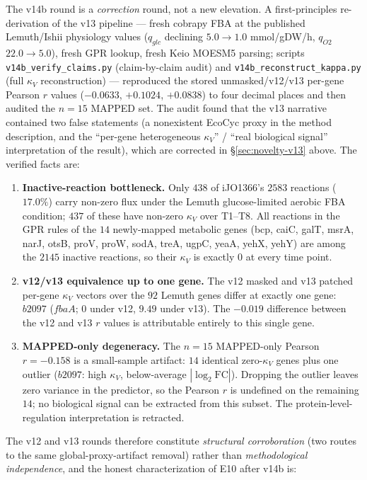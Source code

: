 \documentclass[11pt,a4paper]{article}
\theoremstyle{plain}
\theoremstyle{definition}
\theoremstyle{remark}
\begin{document}
The v14b round is a \emph{correction} round, not a new elevation. A
first-principles re-derivation of the v13 pipeline --- fresh cobrapy
FBA at the published Lemuth/Ishii physiology values ($q_{glc}$
declining $5.0 \to 1.0$ mmol/gDW/h, $q_{O2}$ $22.0 \to 5.0$), fresh
GPR lookup, fresh Keio MOESM5 parsing; scripts
\texttt{v14b\_verify\_claims.py} (claim-by-claim audit) and
\texttt{v14b\_reconstruct\_kappa.py} (full $\kappa_V$ reconstruction)
--- reproduced the stored unmasked/v12/v13 per-gene Pearson $r$ values
($-0.0633$, $+0.1024$, $+0.0838$) to four decimal places and then
audited the $n=15$ MAPPED set. The audit found that the v13 narrative
contained two false statements (a nonexistent EcoCyc proxy in the
method description, and the ``per-gene heterogeneous $\kappa_V$'' /
``real biological signal'' interpretation of the result), which are
corrected in \S\ref{sec:novelty-v13} above. The verified facts are:
\begin{enumerate}\itemsep0pt
\item \textbf{Inactive-reaction bottleneck.} Only $438$ of iJO1366's
  $2583$ reactions ($17.0\%$) carry non-zero flux under the Lemuth
  glucose-limited aerobic FBA condition; $437$ of these have non-zero
  $\kappa_V$ over T1--T8. All reactions in the GPR rules of the $14$
  newly-mapped metabolic genes (bcp, caiC, galT, msrA, narJ, otsB,
  proV, proW, sodA, treA, ugpC, yeaA, yehX, yehY) are among the
  $2145$ inactive reactions, so their $\kappa_V$ is exactly $0$ at
  every time point.
\item \textbf{v12/v13 equivalence up to one gene.} The v12 masked and
  v13 patched per-gene $\kappa_V$ vectors over the $92$ Lemuth genes
  differ at exactly one gene: $b2097$ ($\mathit{fbaA}$; $0$ under v12,
  $9.49$ under v13). The $-0.019$ difference between the v12 and v13
  $r$ values is attributable entirely to this single gene.
\item \textbf{MAPPED-only degeneracy.} The $n=15$ MAPPED-only Pearson
  $r = -0.158$ is a small-sample artifact: $14$ identical
  zero-$\kappa_V$ genes plus one outlier ($b2097$: high $\kappa_V$,
  below-average $|\log_2 \mathrm{FC}|$). Dropping the outlier leaves
  zero variance in the predictor, so the Pearson $r$ is undefined on
  the remaining $14$; no biological signal can be extracted from this
  subset. The protein-level-regulation interpretation is retracted.
\end{enumerate}
\noindent The v12 and v13 rounds therefore constitute
\emph{structural corroboration} (two routes to the same
global-proxy-artifact removal) rather than \emph{methodological
independence}, and the honest characterization of E10 after v14b is:
\end{document}
